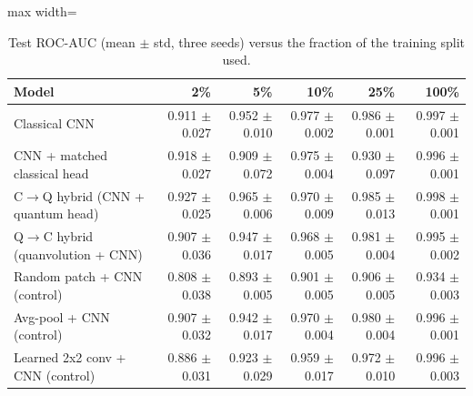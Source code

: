 \begin{table}[htbp]
\centering
\scriptsize
\caption{Test ROC-AUC (mean $\pm$ std, three seeds) versus the fraction of the training split used.}
\label{tab:study_lowdata_auc}
\begin{adjustbox}{max width=\linewidth}
\begin{tabular}{lrrrrr}
\toprule
Model & 2\% & 5\% & 10\% & 25\% & 100\% \\
\midrule
Classical CNN & 0.911 $\pm$ 0.027 & 0.952 $\pm$ 0.010 & 0.977 $\pm$ 0.002 & 0.986 $\pm$ 0.001 & 0.997 $\pm$ 0.001 \\
CNN + matched classical head & 0.918 $\pm$ 0.027 & 0.909 $\pm$ 0.072 & 0.975 $\pm$ 0.004 & 0.930 $\pm$ 0.097 & 0.996 $\pm$ 0.001 \\
C$\rightarrow$Q hybrid (CNN + quantum head) & 0.927 $\pm$ 0.025 & 0.965 $\pm$ 0.006 & 0.970 $\pm$ 0.009 & 0.985 $\pm$ 0.013 & 0.998 $\pm$ 0.001 \\
Q$\rightarrow$C hybrid (quanvolution + CNN) & 0.907 $\pm$ 0.036 & 0.947 $\pm$ 0.017 & 0.968 $\pm$ 0.005 & 0.981 $\pm$ 0.004 & 0.995 $\pm$ 0.002 \\
Random patch + CNN (control) & 0.808 $\pm$ 0.038 & 0.893 $\pm$ 0.005 & 0.901 $\pm$ 0.005 & 0.906 $\pm$ 0.005 & 0.934 $\pm$ 0.003 \\
Avg-pool + CNN (control) & 0.907 $\pm$ 0.032 & 0.942 $\pm$ 0.017 & 0.970 $\pm$ 0.004 & 0.980 $\pm$ 0.004 & 0.996 $\pm$ 0.001 \\
Learned 2x2 conv + CNN (control) & 0.886 $\pm$ 0.031 & 0.923 $\pm$ 0.029 & 0.959 $\pm$ 0.017 & 0.972 $\pm$ 0.010 & 0.996 $\pm$ 0.003 \\
\bottomrule
\end{tabular}
\end{adjustbox}
\end{table}
